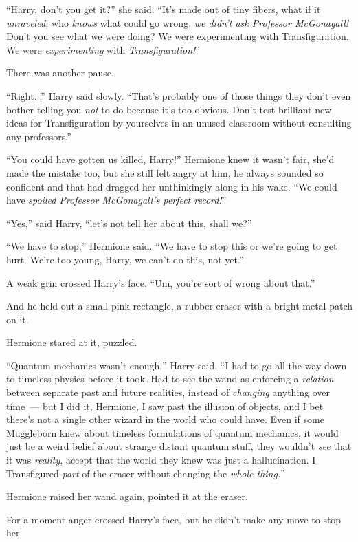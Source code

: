 ``Harry, don't you get it?'' she said. ``It's made out of tiny fibers, what if it \emph{unraveled,} who \emph{knows} what could go wrong, \emph{we didn't ask Professor McGonagall!} Don't you see what we were doing? We were experimenting with Transfiguration. We were \emph{experimenting} with \emph{Transfiguration!}''

There was another pause.

``Right...'' Harry said slowly. ``That's probably one of those things they don't even bother telling you \emph{not} to do because it's too obvious. Don't test brilliant new ideas for Transfiguration by yourselves in an unused classroom without consulting any professors.''

``You could have gotten us killed, Harry!'' Hermione knew it wasn't fair, she'd made the mistake too, but she still felt angry at him, he always sounded so confident and that had dragged her unthinkingly along in his wake. ``We could have \emph{spoiled Professor McGonagall's perfect record!}''

``Yes,'' said Harry, ``let's not tell her about this, shall we?''

``We have to stop,'' Hermione said. ``We have to stop this or we're going to get hurt. We're too young, Harry, we can't do this, not yet.''

A weak grin crossed Harry's face. ``Um, you're sort of wrong about that.''

And he held out a small pink rectangle, a rubber eraser with a bright metal patch on it.

Hermione stared at it, puzzled.

``Quantum mechanics wasn't enough,'' Harry said. ``I had to go all the way down to timeless physics before it took. Had to see the wand as enforcing a \emph{relation} between separate past and future realities, instead of \emph{changing} anything over time~--- but I did it, Hermione, I saw past the illusion of objects, and I bet there's not a single other wizard in the world who could have. Even if some Muggleborn knew about timeless formulations of quantum mechanics, it would just be a weird belief about strange distant quantum stuff, they wouldn't \emph{see} that it was \emph{reality}, accept that the world they knew was just a hallucination. I Transfigured \emph{part} of the eraser without changing the \emph{whole thing.}''

Hermione raised her wand again, pointed it at the eraser.

For a moment anger crossed Harry's face, but he didn't make any move to stop her.

